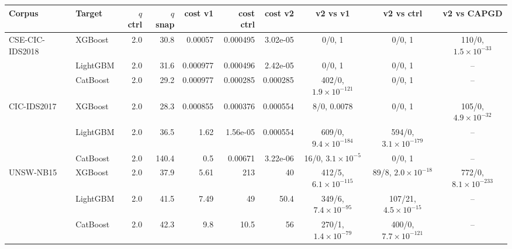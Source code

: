 \begin{tabular}{@{}llrrrrrccc@{}}
\toprule
\textbf{Corpus} & \textbf{Target} & \textbf{$q$ ctrl} & \textbf{$q$ snap} & \textbf{cost v1} & \textbf{cost ctrl} & \textbf{cost v2} & \textbf{v2 vs v1} & \textbf{v2 vs ctrl} & \textbf{v2 vs CAPGD} \\
\midrule
CSE-CIC-IDS2018 & XGBoost & 2.0 & 30.8 & 0.00057 & 0.000495 & 3.02e-05 & 0/0, 1 & 0/0, 1 & 110/0, $1.5\times10^{-33}$ \\
 & LightGBM & 2.0 & 31.6 & 0.000977 & 0.000496 & 2.42e-05 & 0/0, 1 & 0/0, 1 & -- \\
 & CatBoost & 2.0 & 29.2 & 0.000977 & 0.000285 & 0.000285 & 402/0, $1.9\times10^{-121}$ & 0/0, 1 & -- \\
\midrule
CIC-IDS2017 & XGBoost & 2.0 & 28.3 & 0.000855 & 0.000376 & 0.000554 & 8/0, 0.0078 & 0/0, 1 & 105/0, $4.9\times10^{-32}$ \\
 & LightGBM & 2.0 & 36.5 & 1.62 & 1.56e-05 & 0.000554 & 609/0, $9.4\times10^{-184}$ & 594/0, $3.1\times10^{-179}$ & -- \\
 & CatBoost & 2.0 & 140.4 & 0.5 & 0.00671 & 3.22e-06 & 16/0, $3.1\times10^{-5}$ & 0/0, 1 & -- \\
\midrule
UNSW-NB15 & XGBoost & 2.0 & 37.9 & 5.61 & 213 & 40 & 412/5, $6.1\times10^{-115}$ & 89/8, $2.0\times10^{-18}$ & 772/0, $8.1\times10^{-233}$ \\
 & LightGBM & 2.0 & 41.5 & 7.49 & 49 & 50.4 & 349/6, $7.4\times10^{-95}$ & 107/21, $4.5\times10^{-15}$ & -- \\
 & CatBoost & 2.0 & 42.3 & 9.8 & 10.5 & 56 & 270/1, $1.4\times10^{-79}$ & 400/0, $7.7\times10^{-121}$ & -- \\
\bottomrule
\end{tabular}
